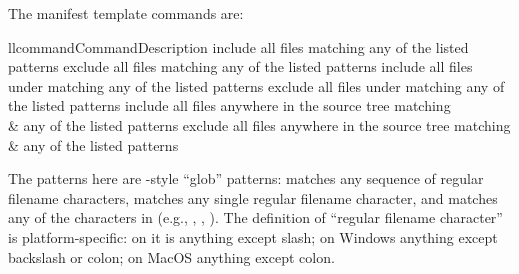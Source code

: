 \documentclass{howto}
\begin{document}
The manifest template commands are:
\begin{tableii}{ll}{command}{Command}{Description}
    {include all files matching any of the listed patterns}
    {exclude all files matching any of the listed patterns}
    {include all files under  matching any of the listed patterns}
    {exclude all files under  matching any of the listed patterns}
    {include all files anywhere in the source tree matching\\&
     any of the listed patterns}
    {exclude all files anywhere in the source tree matching\\&
     any of the listed patterns}
\end{tableii}
The patterns here are \UNIX-style ``glob'' patterns: \code{*} matches any
sequence of regular filename characters,  matches any single
regular filename character, and  matches any of the
characters in  (e.g., , ,
).  The definition of ``regular filename character'' is
platform-specific: on \UNIX{} it is anything except slash; on Windows
anything except backslash or colon; on MacOS anything except colon.











\end{document}
